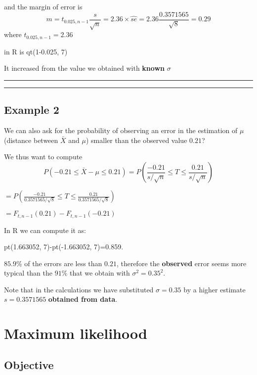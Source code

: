 \documentclass[
]{book}
\begin{document}
and the margin of error is \[m=t_{0.025, n-1} \frac{s}{\sqrt{n}}=2.36\times \hat{se}=2.36\frac{0.3571565}{\sqrt{8}}=0.29\]
where \(t_{0.025, n-1}=2.36\)

in R is qt(1-0.025, 7)

It increased from the value we obtained with \textbf{known} \(\sigma\)

\begin{center}\rule{0.5\linewidth}{0.5pt}\end{center}

\begin{center}\rule{0.5\linewidth}{0.5pt}\end{center}

\hypertarget{example-2-2}{%
\section{Example 2}\label{example-2-2}}

We can also ask for the probability of observing an error in the estimation of \(\mu\) (distance between \(\bar{X}\) and \(\mu\)) smaller than the observed value \(0.21\)?

We thus want to compute \[P(-0.21 \leq \bar{X} - \mu\leq 0.21)=P(\frac{-0.21}{s/\sqrt{n}} \leq T \leq \frac{0.21}{s/\sqrt{n}})\]

\(=P(\frac{-0.21}{0.3571565/\sqrt{8}} \leq T \leq \frac{0.21}{0.3571565/\sqrt{8}})\)

\(=F_{t, n-1}(0.21)-F_{t, n-1}(-0.21)\)

In R we can compute it as:

pt(1.663052, 7)-pt(-1.663052, 7)=0.859.

\(85.9\%\) of the errors are less than \(0.21\), therefore the \textbf{observed} error seems more typical than the \(91\%\) that we obtain with \(\sigma^2=0.35^2\).

Note that in the calculations we have substituted \(\sigma=0.35\) by a higher estimate \(s=0.3571565\) \textbf{obtained from data}.

\hypertarget{maximum-likelihood}{%
\chapter{Maximum likelihood}\label{maximum-likelihood}}

\hypertarget{objective-11}{%
\section{Objective}\label{objective-11}}
\end{document}
